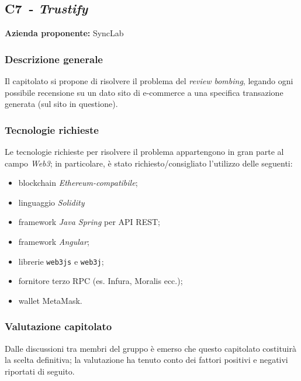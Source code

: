 
\renewcommand{\capName}{\textit{Trustify}} %
\renewcommand{\capCode}{C7} %
\renewcommand{\capLink}{https://www.math.unipd.it/~tullio/IS-1/2022/Progetto/C7.pdf} %
\renewcommand{\capProposer}{SyncLab} %


\subsection{\capCode\ - \capName}
\textbf{Azienda proponente:} SyncLab
\subsubsection{Descrizione generale}
Il capitolato si propone di risolvere il problema del \textit{review bombing}, legando ogni possibile recensione su un dato sito di e-commerce a una specifica transazione generata (sul sito in questione).

\subsubsection{Tecnologie richieste}
Le tecnologie richieste per risolvere il problema appartengono in gran parte al campo \textit{Web3}; in particolare, è stato richiesto/consigliato l'utilizzo delle seguenti:
\begin{itemize}
    \item blockchain \textit{Ethereum-compatibile};
    \item linguaggio \textit{Solidity}
    \item framework \textit{Java Spring} per API REST;
    \item framework \textit{Angular};
    \item librerie \texttt{web3js} e \texttt{web3j};
    \item fornitore terzo RPC (es. Infura, Moralis ecc.);
    \item wallet MetaMask.
\end{itemize}
\subsubsection{Valutazione capitolato}
Dalle discussioni tra membri del gruppo è emerso che questo capitolato costituirà la scelta definitiva; la valutazione ha tenuto conto dei fattori positivi e negativi riportati di seguito.

